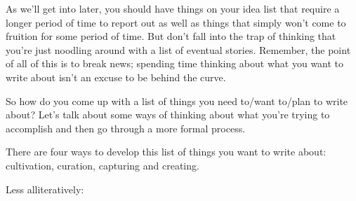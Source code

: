 \documentclass[
  11pt,
  american,
  letterpaperpaper,
  extrafontsizes,onecolumn,openright
  ]{memoir}
\begin{document}
As we'll get into later, you should have things on your idea list that require a longer period of time to report out as well as things that simply won't come to fruition for some period of time. But don't fall into the trap of thinking that you're just noodling around with a list of eventual stories. Remember, the point of all of this is to break news; spending time thinking about what you want to write about isn't an excuse to be behind the curve.

So how do you come up with a list of things you need to/want to/plan to write about? Let's talk about some ways of thinking about what you're trying to accomplish and then go through a more formal process.

There are four ways to develop this list of things you want to write about: cultivation, curation, capturing and creating.

Less alliteratively:
\end{document}
